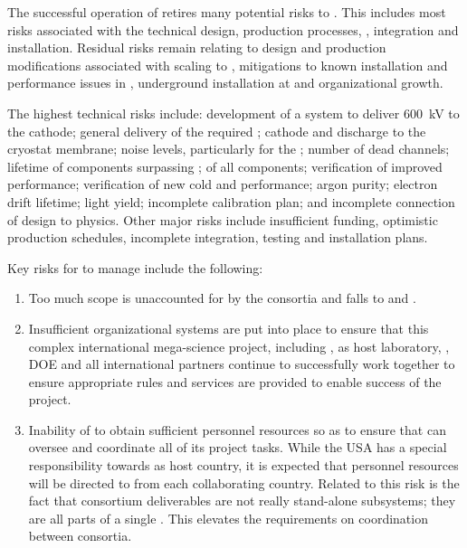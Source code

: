 The successful operation of  retires many
potential risks to . This includes most risks associated with the
technical design, production processes, , integration
and installation. Residual risks remain relating to design and
production modifications associated with scaling to , mitigations
to known installation and performance issues in , underground
installation at \surf and organizational growth.

The highest technical risks include: development of a system to
deliver \SI{600}{kV} to the \dual cathode; general delivery of the
required ; cathode and  discharge to the cryostat
membrane; noise levels, particularly for the ; %
number of dead channels; lifetime of components surpassing \dunelifetime{}; %
 of all components; verification of improved 
performance; verification of new cold   and   performance;
argon purity; electron drift lifetime; \phel light yield;
incomplete calibration plan; and incomplete connection of design to
physics. Other major risks include insufficient funding, optimistic
production schedules, incomplete integration, testing and installation
plans.

Key risks for  to manage include the following:
\begin{enumerate}
\item Too much scope is unaccounted for by the consortia and falls
  to  and .
\item Insufficient organizational systems are put into place to
  ensure that this complex international mega-science project,
  including , \fnal as host laboratory, \surf, DOE and all international
  partners continue to successfully work together to ensure
  appropriate rules and services are provided to enable success of
  the project.
\item Inability of  to obtain sufficient personnel resources so as to
  ensure that  can oversee and coordinate all of its
  project tasks.  While the USA has a special responsibility towards
   as host country, it is expected that personnel resources will
  be directed to  from each collaborating country. Related to this
  risk is the fact that consortium deliverables are not really
  stand-alone subsystems; they are all parts of a single . This
  elevates the requirements on coordination between consortia.
\end{enumerate}

